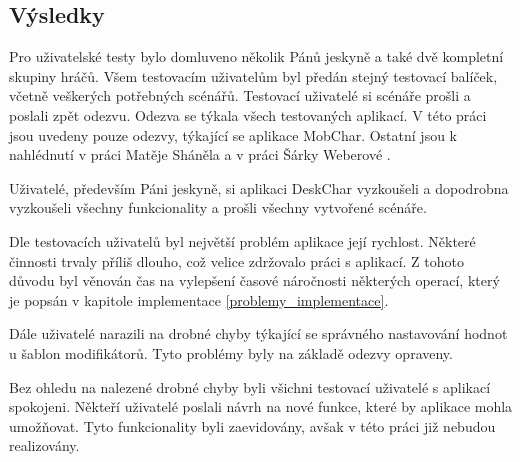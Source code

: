 \documentclass[thesis=B,czech]{resources/FITthesis}[2012/06/26]
\begin{document}
\subsection{Výsledky}
Pro uživatelské testy bylo domluveno několik Pánů jeskyně a také dvě kompletní skupiny hráčů. Všem testovacím uživatelům byl předán stejný testovací balíček, včetně veškerých potřebných scénářů. Testovací uživatelé si scénáře prošli a poslali zpět odezvu. Odezva se týkala všech testovaných aplikací. V této práci jsou uvedeny pouze odezvy, týkající se aplikace MobChar. Ostatní jsou k nahlédnutí v práci Matěje Sháněla\cite{Shanel_2017} a v práci Šárky Weberové \cite{Weberova_2017}. \par

Uživatelé, především Páni jeskyně, si aplikaci DeskChar vyzkoušeli a dopodrobna vyzkoušeli všechny funkcionality a prošli všechny vytvořené scénáře. \par

Dle testovacích uživatelů byl největší problém aplikace její rychlost. Některé činnosti trvaly příliš dlouho, což velice zdržovalo práci s aplikací. Z tohoto důvodu byl věnován čas na vylepšení časové náročnosti některých operací, který je popsán v kapitole implementace \ref{problemy_implementace}. \par

Dále uživatelé narazili na drobné chyby týkající se správného nastavování hodnot u šablon modifikátorů. Tyto problémy byly na základě odezvy opraveny. \par

Bez ohledu na nalezené drobné chyby byli všichni testovací uživatelé s aplikací spokojeni. Někteří uživatelé poslali návrh na nové funkce, které by aplikace mohla umožňovat. Tyto funkcionality byli zaevidovány, avšak v této práci již nebudou realizovány. 
\end{document}
